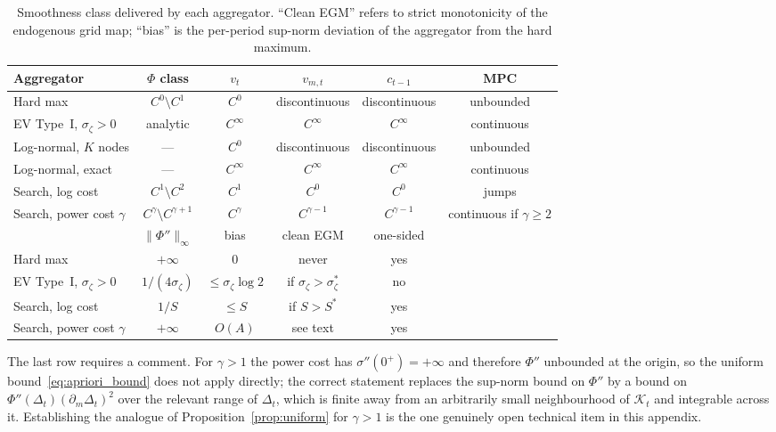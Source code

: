 \begin{table}[htbp]
\centering
\caption{Smoothness class delivered by each aggregator. ``Clean EGM'' refers to
strict monotonicity of the endogenous grid map; ``bias'' is the per-period sup-norm
deviation of the aggregator from the hard maximum.}
\label{tab:smoothclasses}
\begin{tabular}{lccccc}
\toprule
Aggregator & $\Phi$ class & $v_t$ & $v_{m,t}$ & $c_{t-1}$ & MPC \\
\midrule
Hard max & $C^{0}\setminus C^{1}$ & $C^{0}$ & discontinuous & discontinuous & unbounded \\
EV Type~I, $\sigma_\zeta>0$ & analytic & $C^{\infty}$ & $C^{\infty}$ & $C^{\infty}$ & continuous \\
Log-normal, $K$ nodes & --- & $C^{0}$ & discontinuous & discontinuous & unbounded \\
Log-normal, exact & --- & $C^{\infty}$ & $C^{\infty}$ & $C^{\infty}$ & continuous \\
Search, log cost & $C^{1}\setminus C^{2}$ & $C^{1}$ & $C^{0}$ & $C^{0}$ & jumps \\
Search, power cost $\gamma$ & $C^{\gamma}\setminus C^{\gamma+1}$ & $C^{\gamma}$ & $C^{\gamma-1}$ & $C^{\gamma-1}$ & continuous if $\gamma\ge2$ \\
\midrule
& $\|\Phi''\|_\infty$ & bias & clean EGM & one-sided & \\
\midrule
Hard max & $+\infty$ & $0$ & never & yes & \\
EV Type~I, $\sigma_\zeta>0$ & $1/(4\sigma_\zeta)$ & $\le\sigma_\zeta\log 2$ & if $\sigma_\zeta>\sigma_\zeta^{\ast}$ & no & \\
Search, log cost & $1/S$ & $\le S$ & if $S>S^{\ast}$ & yes & \\
Search, power cost $\gamma$ & $+\infty$ & $O(A)$ & see text & yes & \\
\bottomrule
\end{tabular}
\end{table}

The last row requires a comment. For $\gamma>1$ the power cost has
$\sigma''(0^{+})=+\infty$ and therefore $\Phi''$ unbounded at the origin, so the
uniform bound~\eqref{eq:apriori_bound} does not apply directly; the correct statement
replaces the sup-norm bound on $\Phi''$ by a bound on
$\Phi''(\Delta_t)(\partial_m\Delta_t)^{2}$ over the relevant range of $\Delta_t$, which
is finite away from an arbitrarily small neighbourhood of $\mathcal{K}_t$ and
integrable across it. Establishing the analogue of
Proposition~\ref{prop:uniform} for $\gamma>1$ is the one genuinely open technical item
in this appendix.

